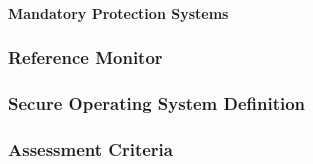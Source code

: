 \documentclass[
  12pt]{findlay}
\begin{document}
\hypertarget{mandatory-protection-systems}{%
\paragraph{Mandatory Protection
Systems}\label{mandatory-protection-systems}}

\hypertarget{reference-monitor}{%
\subsubsection{Reference Monitor}\label{reference-monitor}}

\hypertarget{secure-operating-system-definition}{%
\subsubsection{Secure Operating System
Definition}\label{secure-operating-system-definition}}

\hypertarget{assessment-criteria}{%
\subsubsection{Assessment Criteria}\label{assessment-criteria}}

\printbibliography
\end{document}
